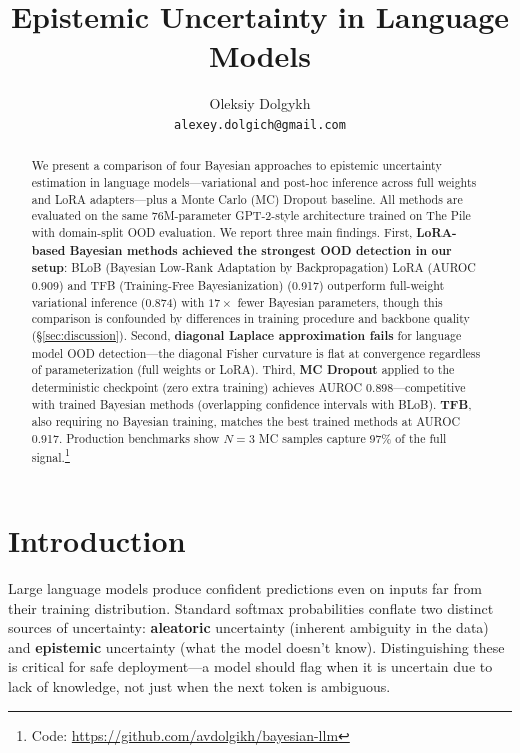 \documentclass{article}
\title{Epistemic Uncertainty in Language Models}
\author{
  Oleksiy Dolgykh \\
  \texttt{alexey.dolgich@gmail.com}
}
\begin{document}
\maketitle

\begin{abstract}
We present a comparison of four Bayesian approaches to epistemic uncertainty estimation in language models---variational and post-hoc inference across full weights and LoRA adapters---plus a Monte Carlo (MC) Dropout baseline. All methods are evaluated on the same 76M-parameter GPT-2-style architecture trained on The Pile with domain-split OOD evaluation. We report three main findings.
First, \textbf{LoRA-based Bayesian methods achieved the strongest OOD detection in our setup}: BLoB (Bayesian Low-Rank Adaptation by Backpropagation) LoRA (AUROC 0.909) and TFB (Training-Free Bayesianization) (0.917) outperform full-weight variational inference (0.874) with $17{\times}$ fewer Bayesian parameters, though this comparison is confounded by differences in training procedure and backbone quality (\S\ref{sec:discussion}).
Second, \textbf{diagonal Laplace approximation fails} for language model OOD detection---the diagonal Fisher curvature is flat at convergence regardless of parameterization (full weights or LoRA).
Third, \textbf{MC Dropout} applied to the deterministic checkpoint (zero extra training) achieves AUROC 0.898---competitive with trained Bayesian methods (overlapping confidence intervals with BLoB).
\textbf{TFB}, also requiring no Bayesian training, matches the best trained methods at AUROC 0.917.
Production benchmarks show $N{=}3$ MC samples capture 97\% of the full signal.\footnote{Code: \url{https://github.com/avdolgikh/bayesian-llm}}
\end{abstract}

\section{Introduction}
\label{sec:introduction}

Large language models produce confident predictions even on inputs far from their training distribution. Standard softmax probabilities conflate two distinct sources of uncertainty: \textbf{aleatoric} uncertainty (inherent ambiguity in the data) and \textbf{epistemic} uncertainty (what the model doesn't know). Distinguishing these is critical for safe deployment---a model should flag when it is uncertain due to lack of knowledge, not just when the next token is ambiguous.
\end{document}
